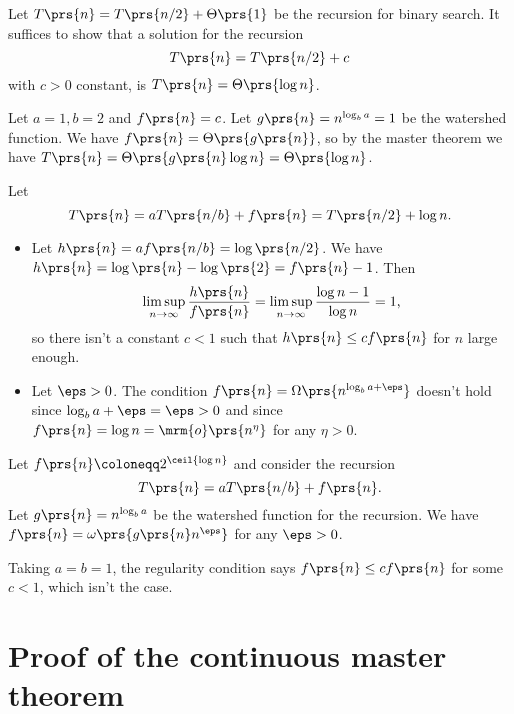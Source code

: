 \documentclass[oneside]{scrbook}
\theoremstyle{definition}
\begin{document}
\begin{exercise} \label{exercise:binary-search-master}
Let $T\prs{n} = T\prs{n/2} + \Theta\prs{1}$ be the recursion for binary search.
It suffices to show that a solution for the recursion
\[T\prs{n} = T\prs{n/2} + c\]
with $c > 0$ constant, is $T\prs{n} = \Theta\prs{\log n}$.

Let $a = 1, b = 2$ and $f\prs{n} = c$. Let $g\prs{n} = n^{\log_b a} = 1$ be the watershed function. We have $f\prs{n} = \Theta\prs{g\prs{n}}$, so by the master theorem we have $T\prs{n} = \Theta\prs{g\prs{n} \log n} = \Theta\prs{\log n}$.
\end{exercise}

\begin{exercise}
Let
\[T\prs{n} = a T\prs{n/b} + f\prs{n} = T\prs{n/2} + \log n \text{.}\]
\begin{itemize}
\item Let $h\prs{n} = a f\prs{n/b} = \log\prs{n/2}$. We have $h\prs{n} = \log\prs{n} - \log\prs{2} = f\prs{n} - 1$. Then \[\limsup_{n \to \infty} \frac{h\prs{n}}{f\prs{n}} = \limsup_{n\to\infty} \frac{\log n - 1}{\log n} = 1 \text{,}\] so there isn't a constant $c < 1$ such that $h\prs{n} \leq c f\prs{n}$ for $n$ large enough.

\item Let $\eps > 0$. The condition $f\prs{n} = \Omega\prs{n^{\log_b a + \eps}}$ doesn't hold since $\log_b a + \eps = \eps > 0$ and since $f\prs{n} = \log n = \mrm{o}\prs{n^\eta}$ for any $\eta > 0$.
\end{itemize}
\end{exercise}

\begin{exercise}
Let $f\prs{n} \coloneqq 2^{\ceil{\log n}}$ and consider the recursion
\[T\prs{n} = a T\prs{n/b} + f\prs{n} \text{.}\]
Let $g\prs{n} = n^{\log_b a}$ be the watershed function for the recursion.
We have $f\prs{n} = \omega\prs{g\prs{n} n^{\eps}}$ for any $\eps > 0$.

Taking $a = b = 1$, the regularity condition says $f\prs{n} \leq c f\prs{n}$ for some $c < 1$, which isn't the case.
\end{exercise}

\section{Proof of the continuous master theorem}
\end{document}
